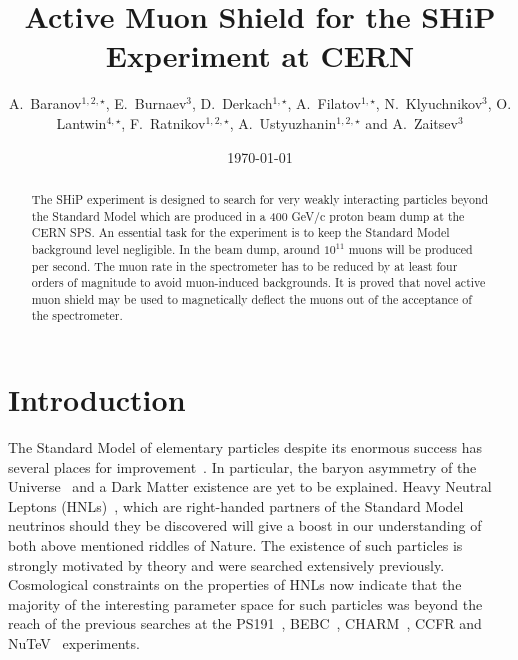 \documentclass[a4paper]{jpconf}
\theoremstyle{my_theorem_style}
\numberwithin{equation}{section}
\begin{document}
\title{Active Muon Shield for the SHiP Experiment at CERN}
\author{A.~Baranov$^{1,2,\star}$, E.~Burnaev$^{3}$,  D.~Derkach$^{1,\star}$, A.~Filatov$^{1,\star}$,
  N.~Klyuchnikov$^{3}$,  O. Lantwin$^{4,\star}$, F.~Ratnikov$^{1,2,\star}$,
  A.~Ustyuzhanin$^{1,2,\star}$  and
 A.~Zaitsev$^{3}$
}
\address{$^1$ National Research University Higher School of Economics,  Moscow, Russia \\
$^2$ Yandex School of Data Analysis, Moscow, Russia \\
$^3$ Skolkovo Institute of Science and Technology, Moscow, Russia \\
$^4$ Imperial College London, London, UK \\
$^\star$ on behalf of the SHiP Collaboration}

\begin{abstract}
The SHiP experiment is designed to search for very weakly interacting particles beyond the Standard Model which are produced in a 400 GeV/c proton beam dump at the CERN SPS. An essential task for the experiment is to keep the Standard Model background level negligible. In the beam dump, around $10^{11}$ muons will be produced per second. The muon rate in the spectrometer has to be reduced by at least four orders of magnitude to avoid muon-induced backgrounds. It is proved that novel active muon shield may be used to magnetically deflect the muons out of the acceptance of the spectrometer.
\end{abstract}

\date{\today}



\section{Introduction}
\label{intro}
The Standard Model of elementary particles despite its enormous success has several places for improvement~\cite{Ellis:2009tp}. In particular, the baryon asymmetry of the Universe~\cite{Asaka:2005pn} and a Dark Matter existence are yet to be explained. Heavy Neutral Leptons (HNLs)~\cite{Asaka:2005an}, which are right-handed partners of the Standard Model neutrinos should they be discovered will give a boost in our understanding of both above mentioned riddles of Nature. The existence of such particles is strongly motivated by theory and were searched extensively previously. Cosmological constraints on the properties of HNLs now indicate that the majority of the interesting parameter space for such particles was beyond the reach of the previous searches at the PS191~\cite{Bernardi:1985ny}, BEBC~\cite{CooperSarkar:1985nh}, CHARM~\cite{Bergsma:1985is}, CCFR and NuTeV~\cite{Vaitaitis:1999wq} experiments. 
\end{document}
